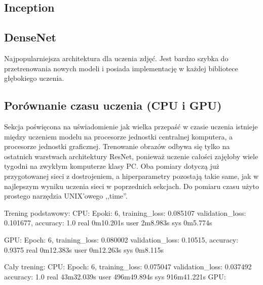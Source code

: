 \documentclass[12pt,a4paper,twoside,titlepage,openright]{book}
\begin{document}
\subsection{Inception}

\subsection{DenseNet}

Najpopularniejsza architektura dla uczenia zdjęć. Jest bardzo szybka do przetrenowania nowych modeli i posiada implementację w każdej bibliotece głębokiego uczenia.

\subsection{Porównanie czasu uczenia (CPU i GPU)}
Sekcja poświęcona na uświadomienie jak wielka przepaść w czasie uczenia istnieje między uczeniem modelu na procesorze jednostki centralnej komputera, a procesorze jednostki graficznej. Trenowanie obrazów odbywa się tylko na ostatnich warstwach architektury ResNet, ponieważ uczenie całości zajęłoby wiele tygodni na zwykłym komputerze klasy PC.
Oba pomiary dotyczą już przygotowanej sieci z dostrojeniem, a hiperparametry pozostają takie same, jak w najlepszym wyniku uczenia sieci w poprzednich sekcjach. Do pomiaru czasu użyto prostego narzędzia UNIX'owego ,,time''.

Trening podstawowy:
CPU: 
Epoki: 6, training\_loss: 0.085107 validation\_loss: 0.101677, accuracy: 1.0
real	0m10.201s
user	2m8.983s
sys	0m5.774s

GPU:
Epoch: 6, training\_loss: 0.080002 validation\_loss: 0.10515, accuracy: 0.9375
real	0m12.383s
user	0m12.263s
sys	0m8.115s

Cały trening:
CPU:
Epoch: 6, training\_loss: 0.075047 validation\_loss: 0.037492 accuracy: 1.0
real	43m32.039s
user	496m49.894s
sys	916m41.221s
GPU:
\end{document}

